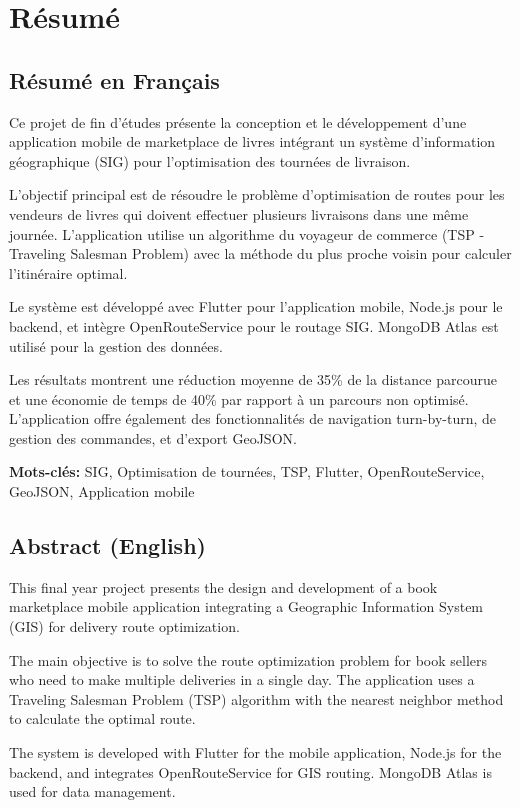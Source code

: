 \documentclass[12pt,a4paper]{report}
\begin{document}
\chapter*{Résumé}
\thispagestyle{empty}

\section*{Résumé en Français}

Ce projet de fin d'études présente la conception et le développement d'une application mobile de marketplace de livres intégrant un système d'information géographique (SIG) pour l'optimisation des tournées de livraison.

L'objectif principal est de résoudre le problème d'optimisation de routes pour les vendeurs de livres qui doivent effectuer plusieurs livraisons dans une même journée. L'application utilise un algorithme du voyageur de commerce (TSP - Traveling Salesman Problem) avec la méthode du plus proche voisin pour calculer l'itinéraire optimal.

Le système est développé avec Flutter pour l'application mobile, Node.js pour le backend, et intègre OpenRouteService pour le routage SIG. MongoDB Atlas est utilisé pour la gestion des données.

Les résultats montrent une réduction moyenne de 35\% de la distance parcourue et une économie de temps de 40\% par rapport à un parcours non optimisé. L'application offre également des fonctionnalités de navigation turn-by-turn, de gestion des commandes, et d'export GeoJSON.

\textbf{Mots-clés:} SIG, Optimisation de tournées, TSP, Flutter, OpenRouteService, GeoJSON, Application mobile

\section*{Abstract (English)}

This final year project presents the design and development of a book marketplace mobile application integrating a Geographic Information System (GIS) for delivery route optimization.

The main objective is to solve the route optimization problem for book sellers who need to make multiple deliveries in a single day. The application uses a Traveling Salesman Problem (TSP) algorithm with the nearest neighbor method to calculate the optimal route.

The system is developed with Flutter for the mobile application, Node.js for the backend, and integrates OpenRouteService for GIS routing. MongoDB Atlas is used for data management.
\end{document}
